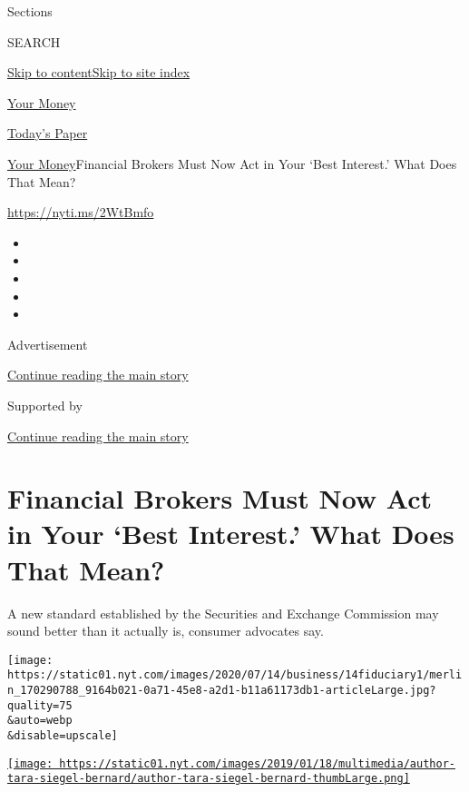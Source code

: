 Sections

SEARCH

\protect\hyperlink{site-content}{Skip to
content}\protect\hyperlink{site-index}{Skip to site index}

\href{https://www.nytimes.com/section/your-money}{Your Money}

\href{https://myaccount.nytimes.com/auth/login?response_type=cookie\&client_id=vi}{}

\href{https://www.nytimes.com/section/todayspaper}{Today's Paper}

\href{/section/your-money}{Your Money}\textbar{}Financial Brokers Must
Now Act in Your `Best Interest.' What Does That Mean?

\url{https://nyti.ms/2WtBmfo}

\begin{itemize}
\item
\item
\item
\item
\item
\end{itemize}

Advertisement

\protect\hyperlink{after-top}{Continue reading the main story}

Supported by

\protect\hyperlink{after-sponsor}{Continue reading the main story}

\hypertarget{financial-brokers-must-now-act-in-your-best-interest-what-does-that-mean}{%
\section{Financial Brokers Must Now Act in Your `Best Interest.' What
Does That
Mean?}\label{financial-brokers-must-now-act-in-your-best-interest-what-does-that-mean}}

A new standard established by the Securities and Exchange Commission may
sound better than it actually is, consumer advocates say.

\texttt{[image: https://static01.nyt.com/images/2020/07/14/business/14fiduciary1/merlin\_170290788\_9164b021-0a71-45e8-a2d1-b11a61173db1-articleLarge.jpg?quality=75\\\&auto=webp\\\&disable=upscale]}

\href{https://www.nytimes.com/by/tara-siegel-bernard}{\texttt{[image: https://static01.nyt.com/images/2019/01/18/multimedia/author-tara-siegel-bernard/author-tara-siegel-bernard-thumbLarge.png]}}

